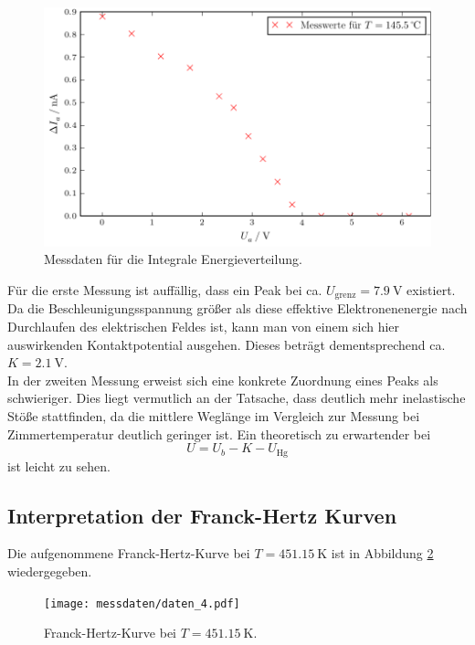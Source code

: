 \begin{figure}[H]
  \centering
  \includegraphics{build/aufgabenteil_a_plot_2.pdf}
  \caption{Messdaten für die Integrale Energieverteilung.}
  \label{fig:plot2}
\end{figure}

Für die erste Messung ist auffällig, dass ein Peak bei ca. $U_{\text{grenz}} = \SI{7.9}{\volt}$ existiert.
Da die Beschleunigungsspannung größer als diese effektive Elektronenenergie nach Durchlaufen des elektrischen Feldes ist, kann man von einem sich hier auswirkenden Kontaktpotential ausgehen.
Dieses beträgt dementsprechend ca. $K = \SI{2.1}{\volt}$.\\
In der zweiten Messung erweist sich eine konkrete Zuordnung eines Peaks als schwieriger.
Dies liegt vermutlich an der Tatsache, dass deutlich mehr inelastische Stöße stattfinden, da die mittlere Weglänge im Vergleich zur Messung bei Zimmertemperatur deutlich geringer ist.
Ein theoretisch zu erwartender bei
\begin{equation}
  U = U_b - K - U_{\text{Hg}}
\end{equation}
ist leicht zu sehen. %

\subsection{Interpretation der Franck-Hertz Kurven}
Die aufgenommene Franck-Hertz-Kurve bei $T = \SI{451.15}{\kelvin}$ ist in Abbildung \ref{fig:abb1} wiedergegeben.

\begin{figure}[H]
  \centering
  \texttt{[image: messdaten/daten\_4.pdf]}
  \caption{Franck-Hertz-Kurve bei $T = \SI{451.15}{\kelvin}$.}
  \label{fig:abb1}
\end{figure}

